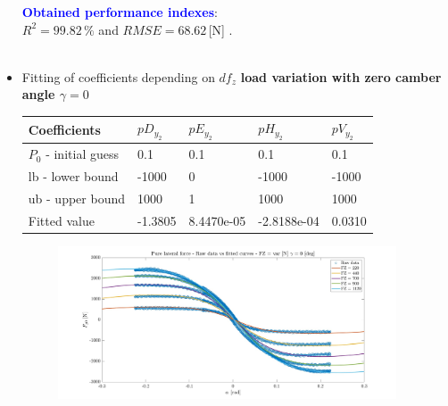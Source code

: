 \documentclass{IEEEtran}
\begin{document}
\begin{itemize}
\begin{figure}[htbp]
                    \label{fig:Fy0nom}
                \end{figure}

                \textbf{\textcolor{blue}{Obtained performance indexes}}: \\ $R^{2} = 99.82 \, \%$ and $RMSE = 68.62 \, $[N] .\\\\
                
            \item Fitting of coefficients depending on \underline{$df_z$} \textbf{load variation with zero camber angle $\gamma = 0$}
                \begin{table}[htbp]
                \begin{center}
                    \begin{tabular}{|l|l|l|l|l|}
                    \hline
                    Coefficients       & $pD_{y_2}$    & $pE_{y_2}$       & $pH_{y_2}$        & $pV_{y_2}$   \\ \hline
                    $P_0$ - initial guess & 0.1     & 0.1        & 0.1         & 0.1    \\ \hline
                    lb - lower bound   & -1000   & 0          & -1000       & -1000  \\ \hline
                    ub - upper bound   & 1000    & 1          & 1000        & 1000   \\ \hline
                    Fitted value       & -1.3805 & 8.4470e-05 & -2.8188e-04 & 0.0310 \\ \hline
                    \end{tabular}
                    \end{center}
                \end{table}
                
                
                \begin{figure}[htbp]
                    \centerline{\includegraphics[width = 3.95in]{pure_lateral_2.jpg}}
                    
                    \label{fig:Fy0dfz}
                \end{figure}
    

\end{itemize}
\end{document}
